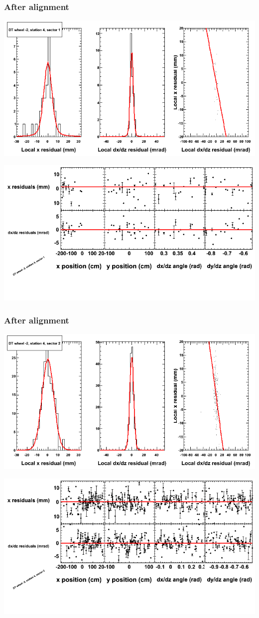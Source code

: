 \documentclass[compress]{beamer}
\begin{document}
\begin{frame}
\frametitle{After alignment}
\includegraphics[width=0.7\linewidth]{NOV4_fitfunctions/MBwhAst4sec01_bellcurves.png}

\includegraphics[width=0.7\linewidth]{NOV4_fitfunctions/MBwhAst4sec01_polynomials.png}
\end{frame}

\begin{frame}
\frametitle{After alignment}
\includegraphics[width=0.7\linewidth]{NOV4_fitfunctions/MBwhAst4sec02_bellcurves.png}

\includegraphics[width=0.7\linewidth]{NOV4_fitfunctions/MBwhAst4sec02_polynomials.png}
\end{frame}
\end{document}
